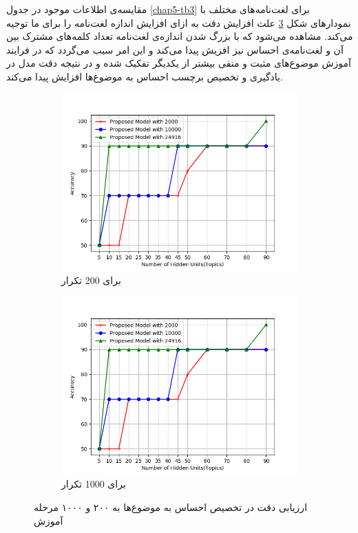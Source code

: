   مقایسه‌ی اطلاعات موجود در جدول
\ref{chap5-tb3}
برای لغت‌نامه‌های مختلف با نمودار‌های شکل
\ref{chap5-fig4}
علت افزایش دقت به ازای افزایش  اندازه لغت‌نامه را برای ما توجیه می‌‌کند. مشاهده می‌‌شود که با بزرگ شدن اندازه‌ی لغت‌نامه تعداد کلمه‌های مشترک بین آن و لغت‌نامه‌ی احساس نیز افزیش پیدا می‌‌کند و این امر سبب می‌گردد که در فرایند آموزش  موضوع‌های مثبت و منفی‌ بیشتر از یکدیگر تفکیک شده و در نتیجه دقت مدل در یادگیری و تخصیص برچسب احساس به موضوع‌ها افزایش پیدا می‌‌کند.
\begin{figure}[!t]
	\centering
	\begin{subfigure}{.46\textwidth}
		\includegraphics[scale = .48]{chap5-img/v_200}
		\caption{ برای 200 تکرار }
		\label{chap5-fig4sub1}
	\end{subfigure}		
	\begin{subfigure}{.46\textwidth}
		\includegraphics[scale =.48]{chap5-img/v_1000}
		\caption{ برای 1000 تکرار }
		\label{chap5-fig4sub2}
	\end{subfigure}
	\caption{ارزیابی دقت در تخصیص احساس به موضوع‌ها به ۲۰۰ و ۱۰۰۰ مرحله آموزش}
	\label{chap5-fig4}
\end{figure}


